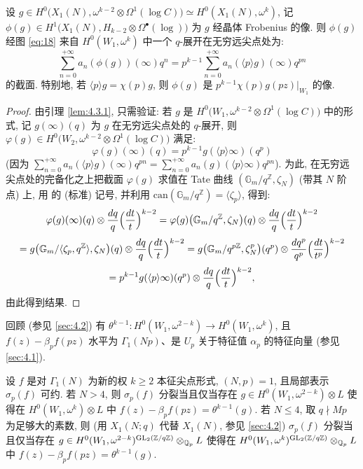 \begin{lemma}\label{lem:4.3.2}
设 $g \in H^{0}\bigl(X_1(N),\omega^{k-2} \otimes \Omega^{1}(\log C)\bigr) \simeq H^{0}(X_1(N),\omega^{k})$, 记 $\phi(g) \in H^{1}\bigl(X_1(N),H_{k-2} \otimes \Omega^{\bullet}(\log)\bigr)$ 为 $g$ 经晶体 Frobenius 的像.
则 $\phi(g)$ 经图 \eqref{eq:18} 来自 $H^{0}(W_1,\omega^{k})$ 中一个 $q$-展开在无穷远尖点处为:
\[
\sum_{n=0}^{+\infty} a_n(\phi(g))(\infty)q^{n} = p^{k-1} \sum_{n=0}^{+\infty} a_n(\langle p \rangle g)(\infty)q^{pn}
\]
的截面.
特别地, 若 $\langle p \rangle g = \chi(p)g$, 则 $\phi(g)$ 是 $p^{k-1}\chi(p)g(pz)|_{W_1}$ 的像.
\end{lemma}

\begin{proof}
由引理 \ref{lem:4.3.1}, 只需验证: 若 $g$ 是 $H^{0}\bigl(W_1,\omega^{k-2} \otimes \Omega^{1}(\log C)\bigr)$ 中的形式, 记 $g(\infty)(q)$ 为 $g$ 在无穷远尖点处的 $q$-展开, 则 $\varphi(g) \in H^{0}\bigl(W_2,\omega^{k-2} \otimes \Omega^{1}(\log C)\bigr)$ 满足:
\[
\varphi(g)(\infty)(q) = p^{k-1}g(\langle p \rangle \infty)(q^{p})
\]
(因为 $\sum_{n=0}^{+\infty} a_n(\langle p \rangle g)(\infty)q^{pn} = \sum_{n=0}^{+\infty} a_n(g)(\langle p \rangle \infty)q^{pn}$).
为此, 在无穷远尖点处的完备化之上把截面 $\varphi(g)$ 求值在 Tate 曲线 $(\mathbb{G}_m/q^{\mathbb{Z}},\zeta_N)$ (带其 $N$ 阶点) 上, 用 \cite[Prop.~3.1.3(1)]{ref:29} 的 (标准) 记号, 并利用 $\mathrm{can}(\mathbb{G}_m/q^{\mathbb{Z}}) = \langle \zeta_p \rangle$, 得到:
\[
\varphi(g)(\infty)(q) \otimes \frac{dq}{q}\Bigl(\frac{dt}{t}\Bigr)^{k-2}
= \varphi(g)\bigl(\mathbb{G}_m/q^{\mathbb{Z}},\zeta_N\bigr)(q) \otimes \frac{dq}{q}\Bigl(\frac{dt}{t}\Bigr)^{k-2}
\]
\[
= g\bigl(\mathbb{G}_m/\langle \zeta_p,q^{\mathbb{Z}} \rangle,\zeta_N\bigr)(q) \otimes \frac{dq}{q}\Bigl(\frac{dt}{t}\Bigr)^{k-2}
= g\bigl(\mathbb{G}_m/q^{p\mathbb{Z}},\zeta_N^{p}\bigr)(q^{p}) \otimes \frac{dq^{p}}{q^{p}}\Bigl(\frac{dt}{t^{p}}\Bigr)^{k-2}
\]
\[
= p^{k-1}g(\langle p \rangle \infty)(q^{p}) \otimes \frac{dq}{q}\Bigl(\frac{dt}{t}\Bigr)^{k-2},
\]
由此得到结果.
\end{proof}

回顾 (参见 \ref{sec:4.2}) 有 $\theta^{k-1} : H^{0}(W_1,\omega^{2-k}) \to H^{0}(W_1,\omega^{k})$, 且 $f(z) - \beta_p f(pz)$ 水平为 $\Gamma_1(Np)$、是 $U_p$ 关于特征值 $\alpha_p$ 的特征向量 (参见 \ref{sec:4.1}).

\begin{theorem}\label{thm:4.3.3}
设 $f$ 是对 $\Gamma_1(N)$ 为新的权 $k \ge 2$ 本征尖点形式, $(N,p) = 1$, 且局部表示 $\sigma_p(f)$ 可约.
若 $N > 4$, 则 $\sigma_p(f)$ 分裂当且仅当存在 $g \in H^{0}(W_1,\omega^{2-k}) \otimes L$ 使得在 $H^{0}(W_1,\omega^{k}) \otimes L$ 中 $f(z) - \beta_p f(pz) = \theta^{k-1}(g)$.
若 $N \le 4$, 取 $q \nmid Mp$ 为足够大的素数, 则 (用 $X_1(N;q)$ 代替 $X_1(N)$, 参见 \ref{sec:4.2}) $\sigma_p(f)$ 分裂当且仅当存在 $g \in H^{0}(W_1,\omega^{2-k})^{\mathrm{GL}_2(\mathbb{Z}/q\mathbb{Z})} \otimes_{\mathbb{Q}_p} L$ 使得在 $H^{0}(W_1,\omega^{k})^{\mathrm{GL}_2(\mathbb{Z}/q\mathbb{Z})} \otimes_{\mathbb{Q}_p} L$ 中 $f(z) - \beta_p f(pz) = \theta^{k-1}(g)$.
\end{theorem}

